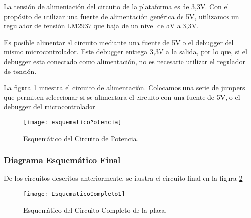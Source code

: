 La tensión de alimentación del circuito de la plataforma es de 3,3V. Con el propósito de utilizar una fuente de alimentación genérica de 5V, utilizamos un regulador de tensión LM2937 que baja de un nivel de 5V a 3,3V.

Es posible alimentar el circuito mediante una fuente de 5V o el debugger del mismo microcontrolador. Este debugger entrega 3,3V a la salida, por lo que, si el debugger esta conectado como alimentación, no es necesario utilizar el regulador de tensión.

La figura \ref{fig:esquematicoPotencia} muestra el circuito de alimentación. Colocamos una serie de jumpers que permiten seleccionar si se alimentara el circuito con una fuente de 5V, o el debugger del microcontrolador

\begin{figure}[H]
  \centering
  \texttt{[image: esquematicoPotencia]}
  \caption{Esquemático del Circuito de Potencia.}\label{fig:esquematicoPotencia}
\end{figure}



\subsubsection{Diagrama Esquemático Final}
\label{it3:ssub:diagrama_esquematico_final}

De los circuitos descritos anteriormente, se ilustra el circuito final en la figura \ref{fig:EsquematicoCompleto1}

\begin{figure}[H]
\centering
  \texttt{[image: EsquematicoCompleto1]}
  \caption{Esquemático del Circuito Completo de la placa.}\label{fig:EsquematicoCompleto1}
\end{figure}



